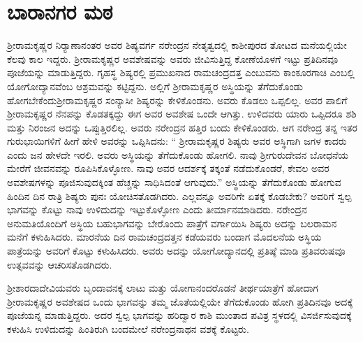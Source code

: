 
\chapter{ಬಾರಾನಗರ ಮಠ }

ಶ‍್ರೀರಾಮಕೃಷ್ಣರ ನಿರ‍್ಯಾಣಾನಂತರ ಅವರ ಶಿಷ್ಯವರ್ಗ ನರೇಂದ್ರನ ನೇತೃತ್ವದಲ್ಲಿ ಕಾಶೀಪುರದ ತೋಟದ ಮನೆಯಲ್ಲಿಯೇ ಕೆಲವು ಕಾಲ ಇದ್ದರು. ಶ‍್ರೀರಾಮಕೃಷ್ಣರ ಅವಶೇಷವನ್ನು ಅವರು ಜೀವಿಸುತ್ತಿದ್ದ ಕೋಣೆಯೊಳಗೆ ಇಟ್ಟು ಪ್ರತಿದಿನವೂ ಪೂಜೆಯನ್ನು ಮಾಡುತ್ತಿದ್ದರು. ಗೃಹಸ್ಥ ಶಿಷ್ಯರಲ್ಲಿ ಪ್ರಮುಖನಾದ ರಾಮಚಂದ್ರದತ್ತ ಎಂಬುವನು ಕಾಂಕೂರಗಾಚಿ ಎಂಬಲ್ಲಿ ಯೋಗೋದ್ಯಾನವೆಂಬ ಆಶ್ರಮವನ್ನು ಕಟ್ಟಿದ್ದನು. ಅಲ್ಲಿಗೆ ಶ‍್ರೀರಾಮಕೃಷ್ಣರ ಅಸ್ಥಿಯನ್ನು ತೆಗೆದುಕೊಂಡು ಹೋಗಬೇಕೆಂದು\break ಶ‍್ರೀರಾಮಕೃಷ್ಣರ ಸಂನ್ಯಾಸೀ ಶಿಷ್ಯರನ್ನು ಕೇಳಿಕೊಂಡನು. ಅವರು ಕೊಡಲು ಒಪ್ಪಲಿಲ್ಲ. ಅವರ ಪಾಲಿಗೆ ಶ‍್ರೀರಾಮಕೃಷ್ಣರ ನೆನಪನ್ನು ಕೊಡತಕ್ಕದ್ದು ಈಗ ಅವರ ಅವಶೇಷ ಒಂದೇ ಆಗಿತ್ತು. ಉಳಿದವರು ಯಾರು ಒಪ್ಪಿದರೂ ಶಶಿ ಮತ್ತು ನಿರಂಜನ ಅದನ್ನು ಒಪ್ಪುತ್ತಿರಲಿಲ್ಲ. ಅವರು ನರೇಂದ್ರನ ಹತ್ತಿರ ಬಂದು ಕೇಳಿಕೊಂಡರು. ಆಗ ನರೇಂದ್ರ ತನ್ನ ಇತರ ಗುರುಭಾಯಿಗಳಿಗೆ ಹೀಗೆ ಹೇಳಿ ಅವರನ್ನು ಒಪ್ಪಿಸಿದನು: “ ಶ‍್ರೀರಾಮಕೃಷ್ಣರ ಶಿಷ್ಯರು ಅವರ ಅಸ್ಥಿಗಾಗಿ ಜಗಳ ಕಾದರು ಎಂದು ಜನ ಹೇಳದೇ ಇರಲಿ. ಅವರು ಅಸ್ಥಿಯನ್ನು ತೆಗೆದುಕೊಂಡು ಹೋಗಲಿ. ನಾವು ಶ‍್ರೀಗುರುದೇವನ ಬೋಧನೆಯ ಮೇರೆಗೆ ಜೀವನವನ್ನು ರೂಪಿಸಿಕೊಳ್ಳೋಣ. ನಾವು ಅವರ ಆದರ್ಶಕ್ಕೆ ತಕ್ಕಂತೆ ನಡೆದುಕೊಂಡರೆ, ಕೇವಲ ಅವರ ಅವಶೇಷಗಳನ್ನು ಪೂಜಿಸುವುದಕ್ಕಿಂತ ಹೆಚ್ಚನ್ನು ಸಾಧಿಸಿದಂತೆ ಆಗುವುದು.” ಅಸ್ಥಿಯನ್ನು ತೆಗೆದುಕೊಂಡು ಹೋಗುವ ಹಿಂದಿನ ದಿನ ರಾತ್ರಿ ಶಿಷ್ಯರು ಪುನಃ ಯೋಚಿಸತೊಡಗಿದರು. ಎಲ್ಲವನ್ನೂ ಅವರಿಗೇ ಏತಕ್ಕೆ ಕೊಡಬೇಕು? ಅವರಿಗೆ ಸ್ವಲ್ಪ ಭಾಗವನ್ನು ಕೊಟ್ಟು ನಾವು ಉಳಿದುದನ್ನು ಇಟ್ಟುಕೊಳ್ಳೋಣ ಎಂದು ತೀರ್ಮಾನಮಾಡಿದರು. ನರೇಂದ್ರನ ಅನುಮತಿಯೊಂದಿಗೆ ಅಸ್ಥಿಯ ಬಹುಭಾಗವನ್ನು ಬೇರೊಂದು ಪಾತ್ರೆಗೆ ವರ್ಗಾಯಿಸಿ ಶಿಷ್ಯರು ಅದನ್ನು ಬಲರಾಮನ ಮನೆಗೆ ಕಳುಹಿಸಿದರು. ಮಾರನೆಯ ದಿನ ರಾಮಚಂದ್ರದತ್ತನ ಕಡೆಯವರು ಬಂದಾಗ ಮೊದಲನೆಯ ಅಸ್ಥಿಯ ಪಾತ್ರೆಯನ್ನು ಅವರಿಗೆ ಕೊಟ್ಟು ಕಳುಹಿಸಿದರು. ಅವರು ಅದನ್ನು ಯೋಗೋದ್ಯಾನದಲ್ಲಿ ಪ್ರತಿಷ್ಠೆ ಮಾಡಿ ಪ್ರತಿವರುಷವೂ ಉತ್ಸವವನ್ನು ಆಚರಿಸತೊಡಗಿದರು.

ಶ‍್ರೀಶಾರದಾದೇವಿಯವರು ಬೃಂದಾವನಕ್ಕೆ ಲಾಟು ಮತ್ತು ಯೋಗಾನಂದರೊಡನೆ ತೀರ್ಥಯಾತ್ರೆಗೆ ಹೋದಾಗ ಶ‍್ರೀರಾಮಕೃಷ್ಣರ ಅವಶೇಷದ ಒಂದು ಭಾಗವನ್ನು ತಮ್ಮ ಜೊತೆಯಲ್ಲಿಯೇ ತೆಗೆದುಕೊಂಡು ಹೋಗಿ ಪ್ರತಿದಿನವೂ ಅದಕ್ಕೆ ಪೂಜೆಯನ್ನ ಮಾಡುತ್ತಿದ್ದರು. ಅದರ ಸ್ವಲ್ಪ ಭಾಗವನ್ನು ಹರಿದ್ವಾರ ಕಾಶಿ ಮುಂತಾದ ಪವಿತ್ರ ಸ್ಥಳದಲ್ಲಿ ವಿಸರ್ಜಿಸುವುದಕ್ಕೆ ಕಳುಹಿಸಿ ಉಳಿದುದನ್ನು ಹಿಂತಿರುಗಿ ಬಂದಮೇಲೆ ನರೇಂದ್ರನಾಥನ ವಶಕ್ಕೆ ಕೊಟ್ಟರು.

